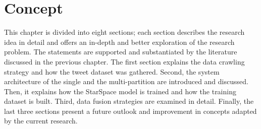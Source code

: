 \chapter{Concept}
\label{chap:concept}
This chapter is divided into eight sections; each section describes the research idea in detail and offers an in-depth and better exploration of the research problem. The statements are supported and substantiated by the literature discussed in the previous chapter. The first section explains the data crawling strategy and how the tweet dataset was gathered. Second, the system architecture of the single and the multi-partition are introduced and discussed. Then, it explains how the StarSpace model is trained and how the training dataset is built. Third, data fusion strategies are examined in detail. Finally, the last three sections present a future outlook and improvement in concepts adapted by the current research.
